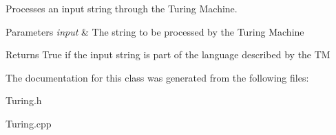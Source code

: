 Processes an input string through the Turing Machine. 


\begin{DoxyParams}{Parameters}
{\em input} & The string to be processed by the Turing Machine\\
\hline
\end{DoxyParams}
\begin{DoxyReturn}{Returns}
True if the input string is part of the language described by the T\-M 
\end{DoxyReturn}


The documentation for this class was generated from the following files\-:\begin{DoxyCompactItemize}
\item 
Turing.\-h\item 
Turing.\-cpp\end{DoxyCompactItemize}
